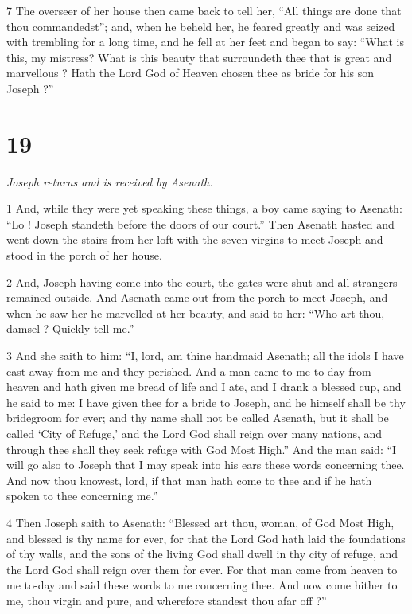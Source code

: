 \par 7 The overseer of her house then came back to tell her, “All things are done that thou commandedst”; and, when he beheld her, he feared greatly and was seized with trembling for a long time, and he fell at her feet and began to say: “What is this, my mistress? What is this beauty that surroundeth thee that is great and marvellous ? Hath the Lord God of Heaven chosen thee as bride for his son Joseph ?”

\chapter{19}

\par \textit{Joseph returns and is received by Asenath.}

\par 1 And, while they were yet speaking these things, a boy came saying to Asenath: “Lo ! Joseph standeth before the doors of our court.” Then Asenath hasted and went down the stairs from her loft with the seven virgins to meet Joseph and stood in the porch of her house. 

\par 2 And, Joseph having come into the court, the gates were shut and all strangers remained outside. And Asenath came out from the porch to meet Joseph, and when he saw her he marvelled at her beauty, and said to her: “Who art thou, damsel ? Quickly tell me.” 

\par 3 And she saith to him: “I, lord, am thine handmaid Asenath; all the idols I have cast away from me and they perished. And a man came to me to-day from heaven and hath given me bread of life and I ate, and I drank a blessed cup, and he said to me: I have given thee for a bride to Joseph, and he himself shall be thy bridegroom for ever; and thy name shall not be called Asenath, but it shall be called ‘City of Refuge,’ and the Lord God shall reign over many nations, and through thee shall they seek refuge with God Most High.” And the man said: “I will go also to Joseph that I may speak into his ears these words concerning thee. And now thou knowest, lord, if that man hath come to thee and if he hath spoken to thee concerning me.” 

\par 4 Then Joseph saith to Asenath: “Blessed art thou, woman, of God Most High, and blessed is thy name for ever, for that the Lord God hath laid the foundations of thy walls, and the sons of the living God shall dwell in thy city of refuge, and the Lord God shall reign over them for ever. For that man came from heaven to me to-day and said these words to me concerning thee. And now come hither to me, thou virgin and pure, and wherefore standest thou afar off ?” 


